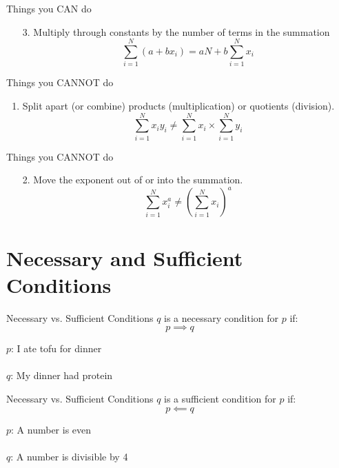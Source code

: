 \documentclass{./../../Latex/teaching_slides}
\begin{document}
\begin{frame}{Things you CAN do}
\begin{enumerate}
\item[3.] Multiply through constants by the number of terms in the summation
$$ \sum_{i=1}^N (a+b x_i)= aN + b \sum_{i=1}^N x_i  $$
\end{enumerate}
\end{frame}

\begin{frame}{Things you CANNOT do}
\begin{enumerate}
\item Split apart (or combine) products (multiplication) or quotients (division).
$$ \sum_{i=1}^N x_i y_i \neq  \sum_{i=1}^N x_i \times \sum_{i=1}^N y_i   $$
\end{enumerate}
\end{frame}

\begin{frame}{Things you CANNOT do}
\begin{enumerate}
\item[2.] Move the exponent out of or into the summation.
$$ \sum_{i=1}^N x_i^a \neq  \left(\sum_{i=1}^N x_i\right)^a $$
\end{enumerate}
\end{frame}

\section{Necessary and Sufficient Conditions}
\begin{frame}{Necessary vs. Sufficient Conditions}
$q$ is a necessary condition for $p$ if:
$$ p \implies q $$ 
\vspace{1em}

\pause
$p$:  I ate tofu for dinner  \\~\\
$q$:  My dinner had protein
\end{frame}

\begin{frame}{Necessary vs. Sufficient Conditions}
$q$ is a sufficient condition for $p$ if:
$$ p \impliedby q $$ 
\vspace{1em}

\pause
$p$:  A number is even \\~\\
$q$:  A number is divisible by 4
\end{frame}
\end{document}
